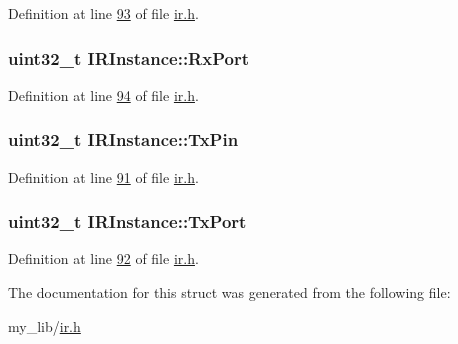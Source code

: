 Definition at line \hyperlink{ir_8h_source_l00093}{93} of file \hyperlink{ir_8h_source}{ir.\-h}.

\hypertarget{struct_i_r_instance_a5202eb791e1291a983144f72a457d38d}{
\subsubsection[{Rx\-Port}]{\setlength{\rightskip}{0pt plus 5cm}uint32\-\_\-t I\-R\-Instance\-::\-Rx\-Port}}\label{struct_i_r_instance_a5202eb791e1291a983144f72a457d38d}


Definition at line \hyperlink{ir_8h_source_l00094}{94} of file \hyperlink{ir_8h_source}{ir.\-h}.

\hypertarget{struct_i_r_instance_ad8db5c2b6d458ef94408fc171aa7fabc}{
\subsubsection[{Tx\-Pin}]{\setlength{\rightskip}{0pt plus 5cm}uint32\-\_\-t I\-R\-Instance\-::\-Tx\-Pin}}\label{struct_i_r_instance_ad8db5c2b6d458ef94408fc171aa7fabc}


Definition at line \hyperlink{ir_8h_source_l00091}{91} of file \hyperlink{ir_8h_source}{ir.\-h}.

\hypertarget{struct_i_r_instance_a0491d3193cddc5b568be222f147dcfcc}{
\subsubsection[{Tx\-Port}]{\setlength{\rightskip}{0pt plus 5cm}uint32\-\_\-t I\-R\-Instance\-::\-Tx\-Port}}\label{struct_i_r_instance_a0491d3193cddc5b568be222f147dcfcc}


Definition at line \hyperlink{ir_8h_source_l00092}{92} of file \hyperlink{ir_8h_source}{ir.\-h}.



The documentation for this struct was generated from the following file\-:\begin{DoxyCompactItemize}
\item 
my\-\_\-lib/\hyperlink{ir_8h}{ir.\-h}\end{DoxyCompactItemize}
